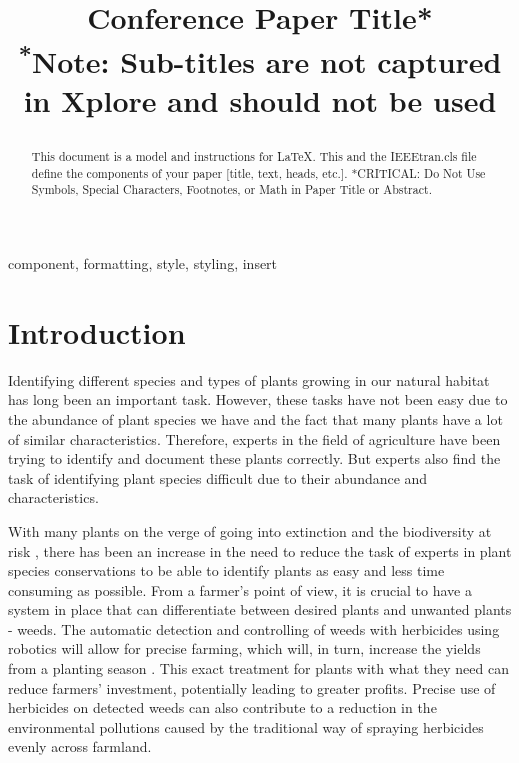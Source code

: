 \documentclass[conference]{IEEEtran}
\begin{document}
\title{Conference Paper Title*\\
{\footnotesize \textsuperscript{*}Note: Sub-titles are not captured in Xplore and
should not be used}

}

\author{

}

\maketitle

\begin{abstract}
\cite{pimm2015many}
This document is a model and instructions for \LaTeX.
This and the IEEEtran.cls file define the components of your paper [title, text, heads, etc.]. *CRITICAL: Do Not Use Symbols, Special Characters, Footnotes, 
or Math in Paper Title or Abstract.
\end{abstract}

\begin{IEEEkeywords}
component, formatting, style, styling, insert
\end{IEEEkeywords}

\section{Introduction}
Identifying different species and types of plants growing in our natural habitat has long been an important task. However, these tasks have not been easy due to the abundance of plant species we have and the fact that many plants have a lot of similar characteristics. Therefore, experts in the field of agriculture have been trying to identify and document these plants correctly. But experts also find the task of identifying plant species difficult due to their abundance and characteristics.

With many plants on the verge of going into extinction and the biodiversity at risk \cite{pimm2015many}, there has been an increase in the need to reduce the task of experts in plant species conservations to be able to identify plants as easy and less time consuming as possible. From a farmer’s point of view, it is crucial to have a system in place that can differentiate between desired plants and unwanted plants - weeds. The automatic detection and controlling of weeds with herbicides using robotics will allow for precise farming, which will, in turn, increase the yields from a planting season \cite{bah2018deep}. This exact treatment for plants with what they need can reduce farmers’ investment, potentially leading to greater profits. Precise use of herbicides on detected weeds can also contribute to a reduction in the environmental pollutions caused by the traditional way of spraying herbicides evenly across farmland.
\end{document}
